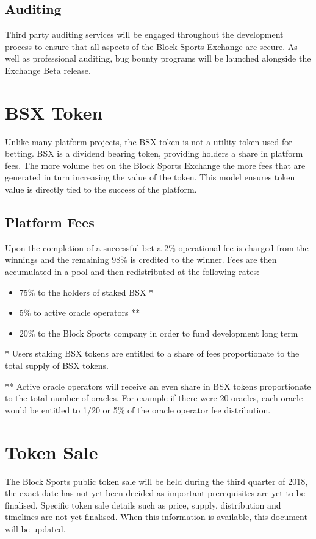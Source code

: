 \documentclass{article}
\begin{document}
	\subsection{Auditing}
Third party auditing services will be engaged throughout the development process to ensure that all aspects of the Block Sports Exchange are secure. As well as professional auditing, 
bug bounty programs will be launched alongside the Exchange Beta release. 
	
\section{BSX Token}

Unlike many platform projects, the BSX token is not a utility token used for betting. BSX is a dividend bearing token, providing holders a share in platform fees. The more volume bet on the Block Sports Exchange the more fees that are generated in turn increasing the value of the token. This model ensures token value is directly tied to the success of the platform. 

	\subsection{Platform Fees}
Upon the completion of a successful bet a 2\% operational fee is charged from the winnings and the remaining 98\% is credited to the winner. Fees are then accumulated in a pool and then redistributed at the following rates:

\begin{itemize}
	\item 75\% to the holders of staked BSX *
	\item 5\% to active oracle operators **
	\item 20\% to the Block Sports company in order to fund development long term

\end{itemize}

* Users staking BSX tokens are entitled to a share of fees proportionate to the total supply of BSX tokens. 

** Active oracle operators will receive an even share in BSX tokens proportionate to the total number of oracles. For example if there were 20 oracles, each oracle would be entitled to 1/20 or 5\% of the oracle operator fee distribution.

\section{Token Sale}
The Block Sports public token sale will be held during the third quarter of 2018, the exact date has not yet been decided as important prerequisites are yet to be finalised. Specific token sale details such as price, supply, distribution and timelines are not yet finalised. When this information is available, this document will be updated.
\end{document}
